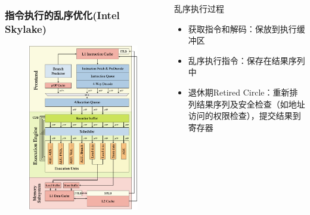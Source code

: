 % 
% 
% 
% 
% 
\begin{frame}
      \begin{columns}
      \begin{column}{0.4\textwidth}
	    \frametitle{指令执行的乱序优化(Intel Skylake)}
		  	\begin{figure}
		  	\includegraphics[width=0.75\linewidth]{figs/skylake-out-of-order.png}
		  	\end{figure}
      \end{column} \pause
      \begin{column}{0.6\textwidth}
		   \begin{block}{乱序执行过程}
		    \begin{itemize}
		        \item 获取指令和解码：保放到执行缓冲区 \pause
		        \item 乱序执行指令：保存在结果序列中 \pause
		        \item 退休期Retired Circle：重新排列结果序列及安全检查（如地址访问的权限检查），提交结果到寄存器
		    \end{itemize}
		    \end{block}
      \end{column}
      \end{columns}
\end{frame}
